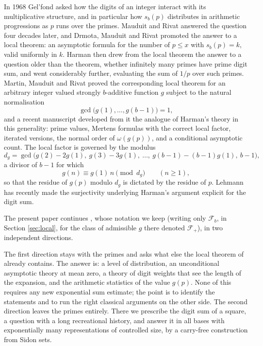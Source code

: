 \documentclass[11pt,reqno]{amsart}
\theoremstyle{plain}
\theoremstyle{definition}
\begin{document}
In 1968 Gel'fond \cite{gelfond} asked how the digits of an integer interact with its multiplicative structure, and in particular how $s_b(p)$ distributes in arithmetic progressions as $p$ runs over the primes. Mauduit and Rivat \cite{mauduitrivat} answered the question four decades later, and Drmota, Mauduit and Rivat \cite{dmr2009} promoted the answer to a local theorem: an asymptotic formula for the number of $p\le x$ with $s_b(p)=k$, valid uniformly in $k$. Harman \cite{harman} then drew from the local theorem the answer to a question older than the theorem, whether infinitely many primes have prime digit sum, and went considerably further, evaluating the sum of $1/p$ over such primes. Martin, Mauduit and Rivat \cite{mmr2019} proved the corresponding local theorem for an arbitrary integer valued strongly $b$-additive function $g$ subject to the natural normalisation
\begin{equation}\label{eq:gcd}
\gcd\big(g(1),\dots,g(b-1)\big)=1,
\end{equation}
and a recent manuscript \cite{vibefrtz} developed from it the analogue of Harman's theory in this generality: prime values, Mertens formulas with the correct local factor, iterated versions, the normal order of $\omega(g(p))$, and a conditional asymptotic count. The local factor is governed by the modulus
\begin{equation}\label{eq:dg}
d_g=\gcd\big(g(2)-2g(1),\ g(3)-3g(1),\ \dots,\ g(b-1)-(b-1)g(1),\ b-1\big),
\end{equation}
a divisor of $b-1$ for which
\begin{equation}\label{eq:congruence}
g(n)\equiv g(1)\,n\pmod{d_g}\qquad(n\ge1),
\end{equation}
so that the residue of $g(p)$ modulo $d_g$ is dictated by the residue of $p$. Lehmann \cite{lehmann} has recently made the surjectivity underlying Harman's argument explicit for the digit sum.

The present paper continues \cite{vibefrtz}, whose notation we keep (writing only $\mathcal F_b$, in Section \ref{sec:local}, for the class of admissible $g$ there denoted $\mathcal F_+$), in two independent directions.

The first direction stays with the primes and asks what else the local theorem of \cite{mmr2019} already contains. The answer is: a level of distribution, an unconditional asymptotic theory at mean zero, a theory of digit weights that see the length of the expansion, and the arithmetic statistics of the value $g(p)$. None of this requires any new exponential sum estimate; the point is to identify the statements and to run the right classical arguments on the other side. The second direction leaves the primes entirely. There we prescribe the digit sum of a square, a question with a long recreational history, and answer it in all bases with exponentially many representations of controlled size, by a carry-free construction from Sidon sets.
\end{document}
